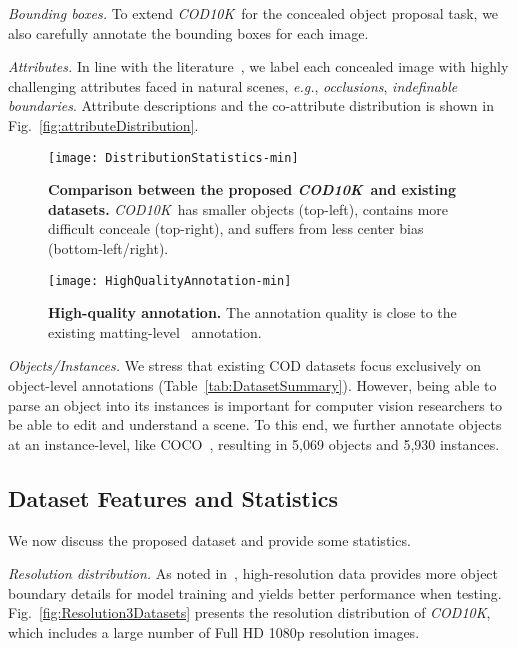 \documentclass[10pt,journal,compsoc]{IEEEtran}
\def\eg{\emph{e.g.}}
\newcommand{\figref}[1]{Fig.~\ref{#1}}
\newcommand{\tabref}[1]{Table~\ref{#1}}
\def\ourdataset{\textit{COD10K}}
\begin{document}
 \emph{Bounding boxes.}
To extend \ourdataset~for the concealed object proposal task,
we also carefully annotate the bounding boxes for each image.

 \emph{Attributes.}
In line with the literature~\cite{Fan2021SOC,perazzi2016benchmark}, 
we label each concealed image with highly challenging attributes faced in natural scenes,
\eg, \emph{occlusions}, \emph{indefinable boundaries}.
Attribute descriptions and the co-attribute distribution is shown in 
\figref{fig:attributeDistribution}.

\begin{figure}[t!]
  \centering
  \texttt{[image: DistributionStatistics-min]}\\
  \vspace{-10pt}
  \caption{\textbf{Comparison between the proposed \ourdataset~and 
    existing datasets.}
    \ourdataset~has smaller objects (top-left),
    contains more difficult conceale (top-right),
    and suffers from less center bias (bottom-left/right).
  }\label{fig:DistributionStatistics}
\end{figure}

\begin{figure}[t!]
  \centering
  \texttt{[image: HighQualityAnnotation-min]}\\
  \vspace{-10pt}
  \caption{\textbf{High-quality annotation.}
	The annotation quality is close to the existing matting-level~\cite{zhang2019late} annotation.
  }\label{fig:highqualityAnnotation}
\end{figure}

 \emph{Objects/Instances.}
We stress that existing COD datasets focus exclusively on
object-level annotations (\tabref{tab:DatasetSummary}).
However, being able to parse an object into its instances is
important for computer vision researchers to be able to edit
and understand a scene.
To this end, we further annotate objects at an instance-level,
like COCO~\cite{lin2014microsoft}, 
resulting in 5,069 objects and 5,930 instances.

\subsection{Dataset Features and Statistics}\label{sec:datasetFeatures}
We now discuss the proposed dataset and provide some statistics. 

 \emph{Resolution distribution.}
As noted in~\cite{zeng2019towards}, high-resolution data
provides more object boundary details for model training and
yields better performance when testing.
\figref{fig:Resolution3Datasets} presents the resolution distribution of 
\ourdataset, which includes a large number of Full HD 1080p resolution images.
\end{document}
